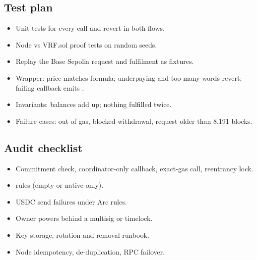 \documentclass[11pt,a4paper]{article}
\begin{document}
\subsection{Test plan}
\begin{itemize}
  \item Unit tests for every call and revert in both flows.
  \item Node vs VRF.sol proof tests on random seeds.
  \item Replay the Base Sepolia request and fulfilment as fixtures.
  \item Wrapper: price matches formula; underpaying and too many words revert; failing callback emits .
  \item Invariants: balances add up; nothing fulfilled twice.
  \item Failure cases: out of gas, blocked withdrawal, request older than 8,191 blocks.
\end{itemize}

\subsection{Audit checklist}
\begin{itemize}
  \item Commitment check, coordinator-only callback, exact-gas call, reentrancy lock.
  \item {} rules (empty or native only).
  \item USDC send failures under Arc rules.
  \item Owner powers behind a multisig or timelock.
  \item Key storage, rotation and removal runbook.
  \item Node idempotency, de-duplication, RPC failover.
\end{itemize}

\end{document}
